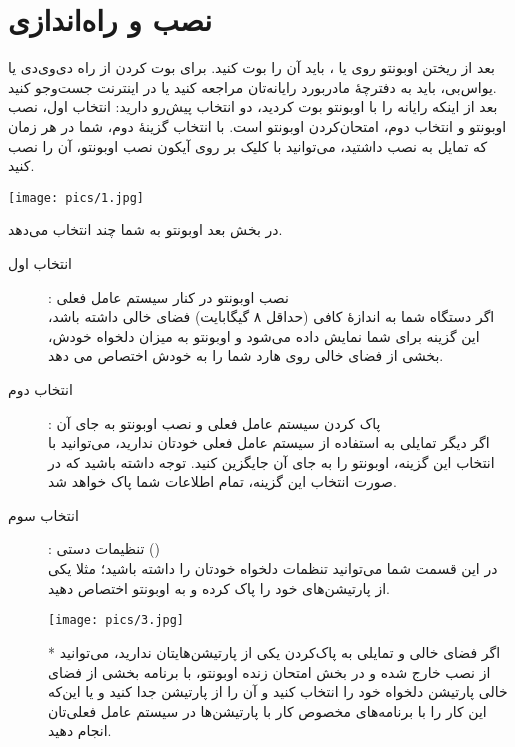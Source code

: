 \section{نصب و راه‌اندازی}
بعد از ریختن اوبونتو روی  یا ، باید آن را بوت کنید. برای بوت کردن از راه دی‌وی‌دی یا یواس‌بی، باید به دفترچهٔ مادربورد رایانه‌تان مراجعه کنید یا در اینترنت جست‌وجو کنید.\\
بعد از اینکه رایانه را با اوبونتو بوت کردید، دو انتخاب پیش‌رو دارید: انتخاب اول، نصب اوبونتو و انتخاب دوم، امتحان‌کردن اوبونتو است. با انتخاب گزینهٔ دوم، شما در هر زمان که تمایل به نصب داشتید، می‌توانید با کلیک بر روی آیکون نصب اوبونتو، آن را نصب کنید.\\
\begin{center}
\texttt{[image: pics/1.jpg]}\\
\end{center}
در بخش بعد اوبونتو به شما چند انتخاب می‌دهد.
\begin{description}
\item[انتخاب اول]: نصب اوبونتو در کنار سیستم عامل فعلی\\
اگر دستگاه شما به اندازهٔ کافی (حداقل ۸ گیگابایت) فضای خالی داشته باشد، این گزینه برای شما نمایش داده می‌شود و اوبونتو به میزان دلخواه خودش، بخشی از فضای خالی روی هارد شما را به خودش اختصاص می دهد.

\item[انتخاب دوم]: پاک کردن سیستم عامل فعلی و نصب اوبونتو به جای آن\\
اگر دیگر تمایلی به استفاده از سیستم عامل فعلی خودتان ندارید، می‌توانید با انتخاب این گزینه، اوبونتو را به جای آن جایگزین کنید. توجه داشته باشید که در صورت انتخاب این گزینه، تمام اطلاعات شما پاک خواهد شد.

\item[انتخاب سوم]: تنظیمات دستی ()\\
در این قسمت شما می‌توانید تنظمات دلخواه خودتان را داشته باشید؛ مثلا یکی از پارتیشن‌های خود را پاک کرده و به اوبونتو اختصاص دهید.\\
\begin{center}
\texttt{[image: pics/3.jpg]}\\
\end{center}
* اگر فضای خالی و تمایلی به پاک‌کردن یکی  از پارتیشن‌هایتان ندارید، می‌توانید از نصب خارج شده و در بخش امتحان زنده اوبونتو، با برنامه  بخشی از فضای خالی پارتیشن  دلخواه خود را انتخاب کنید و آن را از پارتیشن جدا کنید و یا این‌که این کار را با برنامه‌های مخصوص کار با پارتیشن‌ها در سیستم عامل فعلی‌تان انجام دهید.
\end{description}

